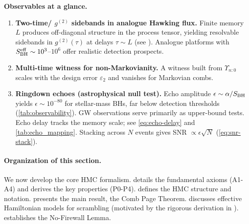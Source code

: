 \documentclass[a4paper,11pt]{article}
\newcommand{\HMC}{\textsc{HMC}\xspace}
\newenvironment{boxedresult}[1]{\begin{infobox}\noindent\textbf{#1.}}{\end{infobox}}
\theoremstyle{plain}
\theoremstyle{definition}
\theoremstyle{remark}
\begin{document}
\begin{boxedresult}{Observables at a glance}
\begin{enumerate}[leftmargin=*]
\item \textbf{Two-time/ \(g^{(2)}\) sidebands in analogue Hawking flux.} Finite memory \(L\) produces off-diagonal structure in the process tensor, yielding resolvable sidebands in \(g^{(2)}(\tau)\) at delays \(\tau\sim L\) (see ). Analogue platforms with $S_{\rm BH}^{\rm eff}\sim 10^3$--$10^6$ offer realistic detection prospects.
\item \textbf{Multi-time witness for non-Markovianity.} A witness built from \(\Upsilon_{n{:}0}\) scales with the design error \(\varepsilon_2\) and vanishes for Markovian combs.
\item \textbf{Ringdown echoes (astrophysical null test).} Echo amplitude $\epsilon\sim \alpha/S_{\rm BH}$ yields $\epsilon\sim 10^{-80}$ for stellar-mass BHs, far below detection thresholds (\cref{tab:observability}). GW observations serve primarily as upper-bound tests. Echo delay tracks the memory scale; see \eqref{eq:echo-delay} and \cref{tab:echo_mapping}. Stacking across \(N\) events gives SNR \(\propto \epsilon \sqrt{N}\) (\eqref{eq:snr-stack}).
\end{enumerate}
\end{boxedresult}

\paragraph{Organization of this section.}
We now develop the core \HMC{} formalism.
 details the fundamental axioms (A1-A4) and derives the key properties (P0-P4).
 defines the \HMC{} structure and notation.
 presents the main result, the Comb Page Theorem.
 discusses effective Hamiltonian models for scrambling (motivated by the rigorous derivation in ).
 establishes the No-Firewall Lemma.
\end{document}
